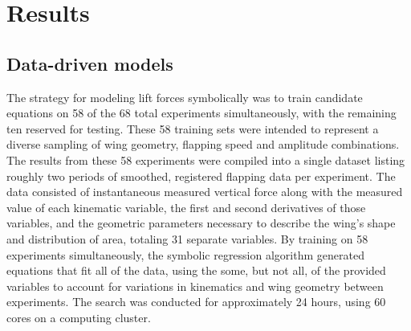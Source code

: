 \documentclass{article}
\begin{document}

\section*{Results}

%
%
%
%
%  

\subsection*{Data-driven models}
The strategy for modeling lift forces symbolically was to train candidate
equations on 58 of the 68 total experiments simultaneously, with the remaining
ten reserved for testing.  These 58 training sets were intended to represent a
diverse sampling of wing geometry, flapping speed and amplitude combinations.
The results from these 58 experiments were compiled into a single dataset
listing roughly two periods of smoothed, registered flapping data per
experiment.  The data consisted of instantaneous measured vertical force along
with the measured value of each kinematic variable, the first and second
derivatives of those variables, and the geometric parameters necessary to
describe the wing's shape and distribution of area, totaling 31 separate
variables. By training on 58 experiments simultaneously, the symbolic regression
algorithm generated equations that fit all of the data, using the some, but not
all, of the provided variables to account for variations in kinematics and wing
geometry between experiments. The search was conducted for approximately 24
hours, using 60 cores on a computing cluster.
\end{document}
